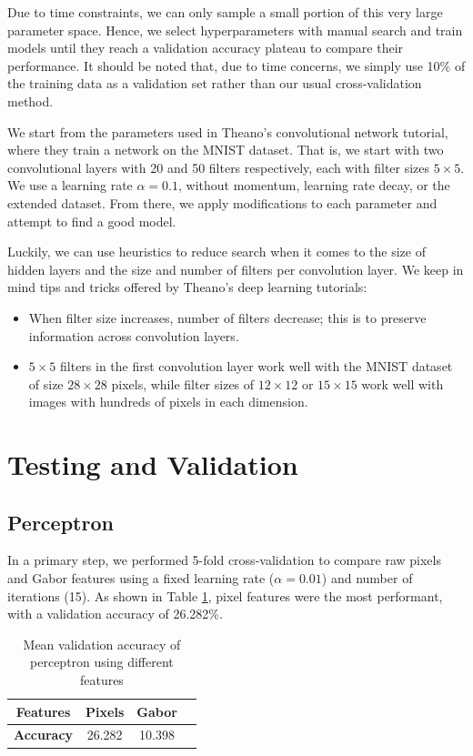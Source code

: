 \documentclass{acm_proc_article-sp}
\begin{document}
Due to time constraints, we can only sample a small portion of this very large parameter space. Hence, we select hyperparameters with manual search and train models until they reach a validation accuracy plateau to compare their performance. It should be noted that, due to time concerns, we simply use 10\% of the training data as a validation set rather than our usual cross-validation method.

We start from the parameters used in Theano's convolutional network tutorial, where they train a network on the MNIST dataset. That is, we start with two convolutional layers with 20 and 50 filters respectively, each with filter sizes $5\times 5$. We use a learning rate $\alpha = 0.1$, without momentum, learning rate decay, or the extended dataset. From there, we apply modifications to each parameter and attempt to find a good model.

Luckily, we can use heuristics to reduce search when it comes to the size of hidden layers and the size and number of filters per convolution layer. We keep in mind tips and tricks offered by Theano's deep learning tutorials\cite{Theano-tut}:
\begin{itemize}
\item When filter size increases, number of filters decrease; this is to preserve information across convolution layers. 
\item $5 \times 5$ filters in the first convolution layer work well with the MNIST dataset of size $28 \times 28$ pixels, while filter sizes of $12\times12$ or $15\times15$ work well with images with hundreds of pixels in each dimension.
\end{itemize}

\section{Testing and Validation}%

\subsection{Perceptron}
In a primary step, we performed 5-fold cross-validation to compare raw pixels and Gabor features using a fixed learning rate ($\alpha = 0.01$) and number of iterations (15). As shown in Table \ref{tab:perc-features}, pixel features were the most performant, with a validation accuracy of 26.282\%.
\begin{table}[h!]
  \centering
  \begin{tabular}{|c||c|c|c| }
    \hline
    {\bfseries Features} & Pixels & Gabor \\
    \hline
    {\bfseries Accuracy} & 26.282  & 10.398 \\
    \hline
  \end{tabular}
  \caption{Mean validation accuracy of perceptron using different features}
  \label{tab:perc-features}
\end{table}
\end{document}
